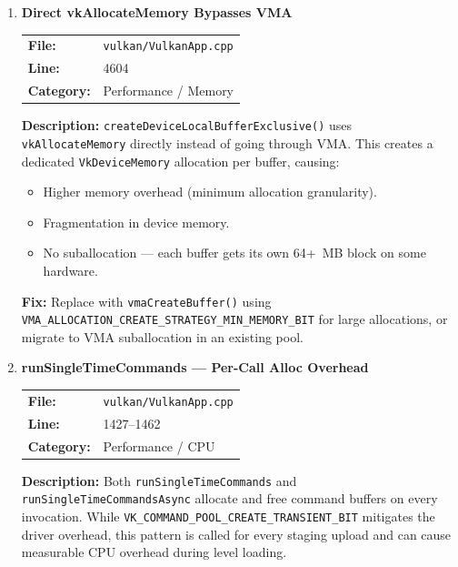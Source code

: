 \documentclass[a4paper,12pt]{article}
\newcommand{\severitybox}[2]{%
  \colorbox{#1}{\makebox[2.5cm][c]{\textcolor{white}{\textbf{#2}}}}%
}
\begin{document}
\begin{enumerate}[leftmargin=*]
\item[\textbf{[P2]}] \textbf{Direct vkAllocateMemory Bypasses VMA}
  \hfill \severitybox{mediumcolor}{MEDIUM}

  \begin{tabular}{ll}
    \textbf{File:} & \texttt{vulkan/VulkanApp.cpp} \\
    \textbf{Line:} & 4604 \\
    \textbf{Category:} & Performance / Memory \\
  \end{tabular}

  \textbf{Description:}
  \texttt{createDeviceLocalBufferExclusive()} uses \texttt{vkAllocateMemory}
  directly instead of going through VMA. This creates a dedicated
  \texttt{VkDeviceMemory} allocation per buffer, causing:

  \begin{itemize}[noitemsep]
    \item Higher memory overhead (minimum allocation granularity).
    \item Fragmentation in device memory.
    \item No suballocation — each buffer gets its own 64+~MB block on some hardware.
  \end{itemize}

  \textbf{Fix:}
  Replace with \texttt{vmaCreateBuffer()} using
  \texttt{VMA\_ALLOCATION\_CREATE\_STRATEGY\_MIN\_MEMORY\_BIT} for large
  allocations, or migrate to VMA suballocation in an existing pool.

\item[\textbf{[P3]}] \textbf{runSingleTimeCommands — Per-Call Alloc Overhead}
  \hfill \severitybox{mediumcolor}{MEDIUM}

  \begin{tabular}{ll}
    \textbf{File:} & \texttt{vulkan/VulkanApp.cpp} \\
    \textbf{Line:} & 1427--1462 \\
    \textbf{Category:} & Performance / CPU \\
  \end{tabular}

  \textbf{Description:}
  Both \texttt{runSingleTimeCommands} and \texttt{runSingleTimeCommandsAsync}
  allocate and free command buffers on every invocation. While
  \texttt{VK\_COMMAND\_POOL\_CREATE\_TRANSIENT\_BIT} mitigates the driver
  overhead, this pattern is called for every staging upload and can cause
  measurable CPU overhead during level loading.


\end{enumerate}
\end{document}
